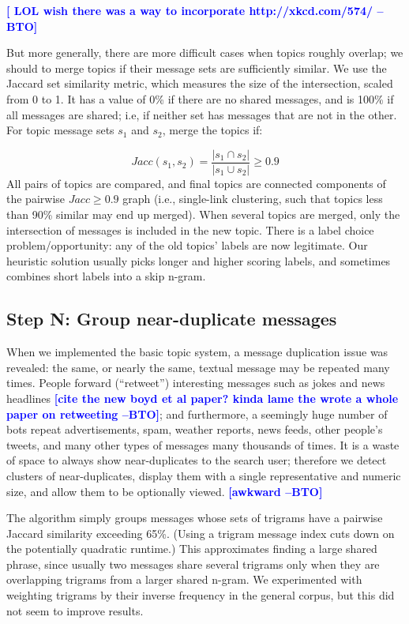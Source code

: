 \documentclass[letterpaper]{article}
\newcommand{\bto}[1]{\textcolor{blue}{\textbf{[#1 --BTO]}}}
\newcommand{\codenote}[1]{}
\begin{document}
\bto{ LOL wish there was a way to incorporate http://xkcd.com/574/ }

But more generally, there are more difficult cases when topics roughly overlap; we should to merge topics if their message sets are sufficiently similar.  We use the Jaccard set similarity metric, which measures the size of the intersection, scaled from 0 to 1.  It has a value of 0\% if there are no shared messages, and is 100\% if all messages are shared; i.e, if neither set has messages that are not in the other.  For topic message sets $s_1$ and $s_2$, merge the topics if:

\[ Jacc(s_1,s_2) = \frac{ |s_1 \cap s_2| }{ |s_1 \cup s_2 | } \geq 0.9 
\]
All pairs of topics are compared, and final topics are connected components of the pairwise $Jacc \geq 0.9$ graph (i.e., single-link clustering, such that topics less than 90\% similar may end up merged).  When several topics are merged, only the intersection of messages is included in the new topic.  There is a label choice problem/opportunity: any of the old topics' labels are now legitimate.  Our heuristic solution usually picks longer and higher scoring labels, and sometimes combines short labels into a skip n-gram.

\subsection{Step N: Group near-duplicate messages}

\codenote{ deduper.py }
When we implemented the basic topic system, a message duplication issue was revealed: the same, or nearly the same, textual message may be repeated many times.  People forward (``retweet'') interesting messages such as jokes and news headlines \bto{cite the new boyd et al paper?  kinda lame the wrote a whole paper on retweeting}; and furthermore, a seemingly huge number of bots repeat advertisements, spam, weather reports, news feeds, other people's tweets, and many other types of messages many thousands of times.  It is a waste of space to always show near-duplicates to the search user; therefore we detect clusters of near-duplicates, display them with a single representative and numeric size, and allow them to be optionally viewed.  \bto{awkward}

The algorithm simply groups messages whose sets of trigrams have a pairwise Jaccard similarity exceeding 65\%.  (Using a trigram message index cuts down on the potentially quadratic runtime.)  This approximates finding a large shared phrase, since usually two messages share several trigrams only when they are overlapping trigrams from a larger shared n-gram.  We experimented with weighting trigrams by their inverse frequency in the general corpus, but this did not seem to improve results.   
\end{document}
